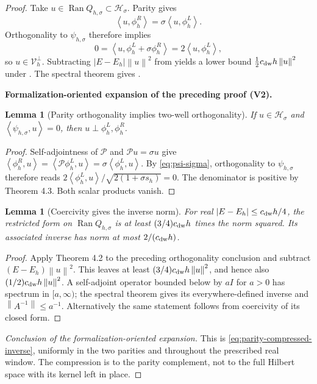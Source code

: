 \documentclass[11pt]{article}
\newtheorem{lemma}[theorem]{Lemma}
\newcommand{\formalisationparentid}{X}
\newenvironment{formalisationaddition}[1]{\par\medskip\begingroup\color{blue}\def\formalisationparentid{#1}\setcounter{formalizationsublemma}{0}\let\lemma\formalizationsublemma\let\endlemma\endformalizationsublemma
  \def\Eo{\mathcal E_h^\circ}\def\EE{\mathcal E_h}\def\phio{\phi_h^\circ}\def\phih{\phi_h}\def\Ho{H_h^{\rm atom}(v^\circ)}\def\Ha{H_h^{\rm atom}}\def\HL{H_h^{L}}\def\Dh{D_h}\def\Log{\operatorname{Log}}\def\ellh{\ell_h}\def\Gp{G_{p,h}}\def\Ast{A_{*,h}}\def\ahat{\widehat{\mathfrak a}_h}\def\ah{\mathfrak a_h}\def\rh{\widehat\rho_h}\def\deltah{\widehat\delta_h}\def\oldref##1{\textup{(##1)}}\def\interface##1{\par\noindent\textit{Analytical interface used here.} ##1\par}\def\finish{\par\noindent\textit{Conclusion of the formalization-oriented expansion.} }\par\noindent\textbf{Formalization-oriented expansion of the preceding proof (V2).}\par\smallskip
}{\par\endgroup\medskip
}
\newcommand{\norm}[1]{\left\|#1\right\|}
\newcommand{\ip}[2]{\left\langle #1,#2\right\rangle}
\newcommand{\Ran}{\operatorname{Ran}}
\begin{document}
\begin{proof}
Take $u\in\Ran Q_{h,\sigma}\subset\mathcal H_\sigma$.  Parity gives
\[
 \ip{u}{\phi_h^R}=\sigma\ip{u}{\phi_h^L}.
\]
Orthogonality to $\psi_{h,\sigma}$ therefore implies
\[
 0=\ip{u}{\phi_h^L+\sigma\phi_h^R}
 =2\ip{u}{\phi_h^L},
\]
so $u\in\mathcal V_h^\perp$.  Subtracting
$|E-E_h|\norm{u}^2$ from  yields a lower bound
$\frac12c_{\rm dw}h\norm{u}^2$ under .  The spectral
theorem gives .

\begin{formalisationaddition}{C4.5}
\begin{lemma}[Parity orthogonality implies two-well orthogonality]\label{sublemma:C4-5-orthogonality}
If $u\in\mathcal H_\sigma$ and $\ip{\psi_{h,\sigma}}u=0$, then $u\perp\phi_h^L,\phi_h^R$.
\end{lemma}
\begin{proof}
Self-adjointness of $\mathcal P$ and $\mathcal Pu=\sigma u$ give
$\ip{\phi_h^R}u=\ip{\mathcal P\phi_h^L}u=\sigma\ip{\phi_h^L}u$.
By \eqref{eq:psi-sigma}, orthogonality to $\psi_{h,\sigma}$ therefore reads
$2\ip{\phi_h^L}u/\sqrt{2(1+\sigma s_h)}=0$.
The denominator is positive by Theorem 4.3. Both scalar products vanish.
\end{proof}

\begin{lemma}[Coercivity gives the inverse norm]\label{sublemma:C4-5-inverse}
For real $|E-E_h|\le c_{\rm dw}h/4$, the restricted form on $\Ran Q_{h,\sigma}$ is at least $(3/4)c_{\rm dw}h$ times the norm squared. Its associated inverse has norm at most $2/(c_{\rm dw}h)$.
\end{lemma}
\begin{proof}
Apply Theorem 4.2 to the preceding orthogonality conclusion and subtract $(E-E_h)\norm u^2$. This leaves at least $(3/4)c_{\rm dw}h\norm u^2$, and hence also $(1/2)c_{\rm dw}h\norm u^2$. A self-adjoint operator bounded below by $aI$ for $a>0$ has spectrum in $[a,\infty)$; the spectral theorem gives its everywhere-defined inverse and $\norm{A^{-1}}\le a^{-1}$. Alternatively the same statement follows from coercivity of its closed form.
\end{proof}
\finish This is \eqref{eq:parity-compressed-inverse}, uniformly in the two parities and throughout the prescribed real window. The compression is to the parity complement, not to the full Hilbert space with its kernel left in place.
\end{formalisationaddition}

\end{proof}
\end{document}
